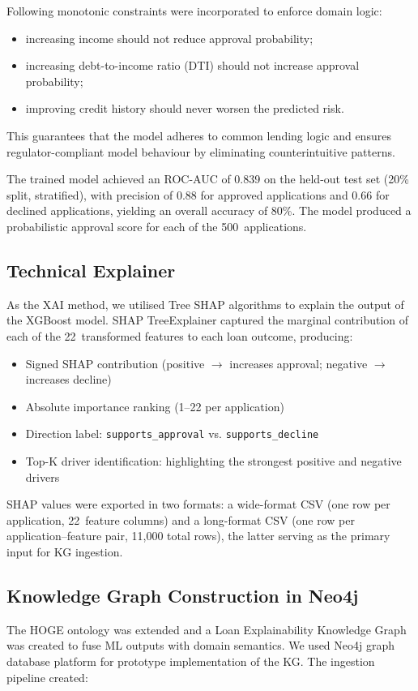 \documentclass[lnbip]{svmultln}
\begin{document}
Following monotonic constraints were incorporated to enforce domain logic:
    \begin{itemize}
        \item increasing income should not reduce approval probability;
        \item increasing debt-to-income ratio (DTI) should not increase approval probability;
        \item improving credit history should never worsen the predicted risk.
    \end{itemize}
This guarantees that the model adheres to common lending logic and ensures regulator-compliant model behaviour by eliminating counterintuitive patterns.

The trained model achieved an ROC-AUC of 0.839 on the held-out test set (20\% split, stratified), with precision of 0.88 for approved applications and 0.66 for declined applications, yielding an overall accuracy of 80\%. The model produced a probabilistic approval score for each of the 500~applications.


\subsection{Technical Explainer}
As the XAI method, we utilised Tree SHAP algorithms to explain the output of the XGBoost model. SHAP TreeExplainer captured the marginal contribution of each of the 22~transformed features to each loan outcome, producing:
\begin{itemize}
    \item Signed SHAP contribution (positive $\rightarrow$ increases approval; negative $\rightarrow$ increases decline)
    \item Absolute importance ranking (1--22 per application)
    \item Direction label: \texttt{supports\_approval} vs. \texttt{supports\_decline}
    \item Top-K driver identification: highlighting the strongest positive and negative drivers
\end{itemize}

SHAP values were exported in two formats: a wide-format CSV (one row per application, 22~feature columns) and a long-format CSV (one row per application--feature pair, 11,000 total rows), the latter serving as the primary input for KG ingestion.


\subsection{Knowledge Graph Construction in Neo4j}
The HOGE ontology was extended and a Loan Explainability Knowledge Graph was created to fuse ML outputs with domain semantics. We used Neo4j graph database platform for prototype implementation of the KG. The ingestion pipeline created:
\end{document}
